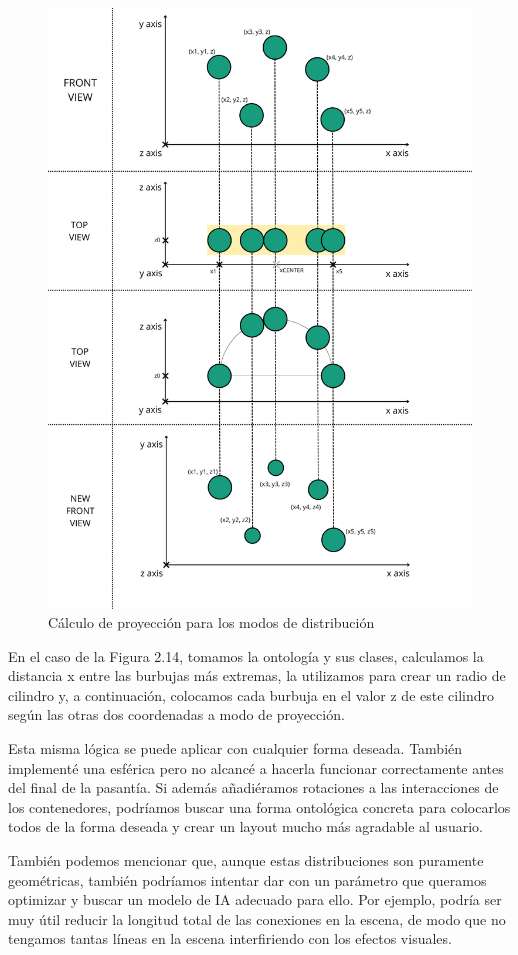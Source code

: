 \begin{figure}[ht]
   \begin{center}
      \includegraphics[width=0.8\linewidth]{chapter2/figures/clusters shape.png}
   \end{center}
   \caption[Cálculo de proyección para los modos de distribución]
   {\footnotesize Cálculo de proyección para los modos de distribución}
   \label{fig:mufigure17}
\end{figure}

En el caso de la Figura 2.14, tomamos la ontología y sus clases, calculamos la distancia x entre las burbujas más extremas, la utilizamos para crear un radio de cilindro y, a continuación, colocamos cada burbuja en el valor z de este cilindro según las otras dos coordenadas a modo de proyección.

Esta misma lógica se puede aplicar con cualquier forma deseada. También implementé una esférica pero no alcancé a hacerla funcionar correctamente antes del final de la pasantía. Si además añadiéramos rotaciones a las interacciones de los contenedores, podríamos buscar una forma ontológica concreta para colocarlos todos de la forma deseada y crear un layout mucho más agradable al usuario.

También podemos mencionar que, aunque estas distribuciones son puramente geométricas, también podríamos intentar dar con un parámetro que queramos optimizar y buscar un modelo de IA adecuado para ello. Por ejemplo, podría ser muy útil reducir la longitud total de las conexiones en la escena, de modo que no tengamos tantas líneas en la escena interfiriendo con los efectos visuales.
